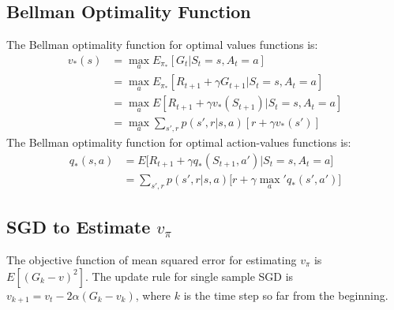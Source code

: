 \documentclass[twoside]{article}
\begin{document}
\subsection{Bellman Optimality Function}

The Bellman optimality function for optimal values functions is: 
\begin{align*}
v_*(s) &= \max_a E_{\pi_*}[G_t | S_t=s, A_t=a] \\
&= \max_a E_{\pi_*}[R_{t+1} + \gamma G_{t+1} | S_t=s, A_t=a] \\
&= \max_a E[R_{t+1} + \gamma v_*(S_{t+1}) | S_t=s, A_t=a] \\
&= \max_a \sum_{s', r}p(s', r|s,a)[r+\gamma v_*(s')]
\end{align*}
The Bellman optimality function for optimal action-values functions is:
\begin{align*}
q_*(s, a) &= E\Big[ R_{t+1} + \gamma q_*(S_{t+1}, a') \Big| S_t=s, A_t=a \Big] \\
&= \sum_{s',r}p(s', r|s,a)\Big[ r+ \gamma\max_a' q_*(s', a') \Big]
\end{align*}

\subsection{SGD to Estimate $v_\pi$}

The objective function of mean squared error for estimating $ v_\pi $ is $E[(G_k - v)^2]$. The update rule for single sample SGD is $ v_{k+1} = v_t - 2\alpha(G_k - v_k) $, where $ k $ is the time step so far from the beginning.
\end{document}
